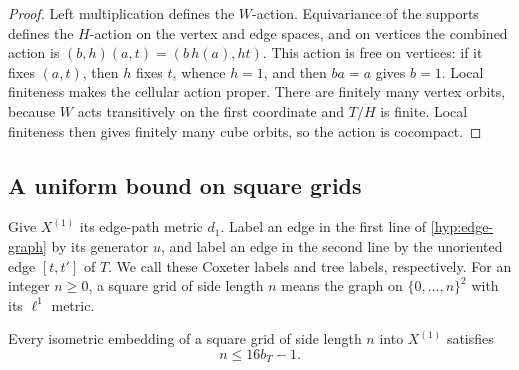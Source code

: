\begin{proof}
Left multiplication defines the \(W\)-action.  Equivariance of the
supports defines the \(H\)-action on the vertex and edge spaces, and
on vertices the combined action is
\((b,h)(a,t)=(b\,h(a),ht)\).  This action is free on vertices:
if it fixes \((a,t)\), then \(h\) fixes \(t\), whence \(h=1\), and
then \(ba=a\) gives \(b=1\).  Local finiteness makes the cellular
action proper.  There are finitely many vertex orbits, because \(W\)
acts transitively on the first coordinate and \(T/H\) is finite.
Local finiteness then gives finitely many cube orbits, so the action is
cocompact.
\end{proof}

\subsection{A uniform bound on square grids}

Give \(X^{(1)}\) its edge-path metric \(d_1\).  Label an edge in the
first line of \eqref{hyp:edge-graph} by its generator \(u\), and label
an edge in the second line by the unoriented edge \([t,t']\) of \(T\).
We call these Coxeter labels and tree labels, respectively.  For an
integer \(n\geq0\), a square grid of side length \(n\) means the graph on
\(\{0,\ldots,n\}^2\) with its \(\ell^1\) metric.

\begin{lemma}
\label{hyp:bounded-grids}
Every isometric embedding of a square grid of side length \(n\) into
\(X^{(1)}\) satisfies
\[
n\leq 16b_T-1.
\]
\end{lemma}


